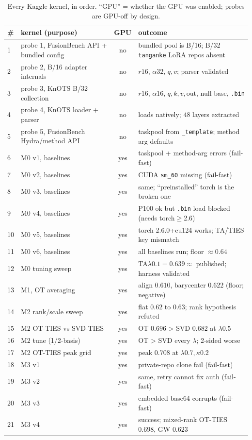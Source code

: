 \documentclass[11pt]{article}
\newcommand{\otties}{\textsc{OT-TIES}}
\newcommand{\svdties}{\textsc{SVD-TIES}}
\begin{document}
\begin{table}[h]
\centering
\caption{Every Kaggle kernel, in order. ``GPU'' = whether the GPU was enabled; probes are GPU-off by
design.}
\label{tab:timeline}
\small
\begin{tabular}{p{0.4cm} p{5.4cm} c p{6.6cm}}
\toprule
\# & kernel (purpose) & GPU & outcome \\
\midrule
1 & probe 1, FusionBench API + bundled config & no & bundled pool is B/16; B/32 \texttt{tanganke} LoRA
repos absent \\
2 & probe 2, B/16 adapter internals & no & $r16$, $\alpha32$, $q,v$; parser validated \\
3 & probe 3, KnOTS B/32 collection & no & $r16$, $\alpha16$, $q,k,v,\text{out}$, null base, \texttt{.bin} \\
4 & probe 4, KnOTS loader + parser & no & loads natively; $48$ layers extracted \\
5 & probe 5, FusionBench Hydra/method API & no & taskpool from \texttt{\_template}; method arg defaults \\
6 & M0 v1, baselines & yes & taskpool + method-arg errors (fail-fast) \\
7 & M0 v2, baselines & yes & CUDA \texttt{sm\_60} missing (fail-fast) \\
8 & M0 v3, baselines & yes & same; ``preinstalled'' torch is the broken one \\
9 & M0 v4, baselines & yes & P100 ok but \texttt{.bin} load blocked (needs torch$\ge$2.6) \\
10 & M0 v5, baselines & yes & torch 2.6.0+cu124 works; TA/TIES key mismatch \\
11 & M0 v6, baselines & yes & all baselines run; floor $\approx0.64$ \\
12 & M0 tuning sweep & yes & TA$\lambda0.1{=}0.639\approx$ published; harness validated \\
13 & M1, OT averaging & yes & align $0.610$, barycenter $0.622$ (floor; negative) \\
14 & M2 rank/scale sweep & yes & flat $0.62$ to $0.63$; rank hypothesis refuted \\
15 & M2 \otties{} vs \svdties{} & yes & OT $0.696$ > SVD $0.682$ at $\lambda0.5$ \\
16 & M2 tune (1/2-basis) & yes & OT > SVD every $\lambda$; 2-sided worse \\
17 & M2 \otties{} peak grid & yes & peak $0.708$ at $\lambda0.7,\kappa0.2$ \\
18 & M3 v1 & yes & private-repo clone fail (fail-fast) \\
19 & M3 v2 & yes & same, retry cannot fix auth (fail-fast) \\
20 & M3 v3 & yes & embedded base64 corrupts (fail-fast) \\
21 & M3 v4 & yes & success; mixed-rank \otties{} $0.698$, GW $0.623$ \\
\bottomrule
\end{tabular}
\end{table}
\end{document}
